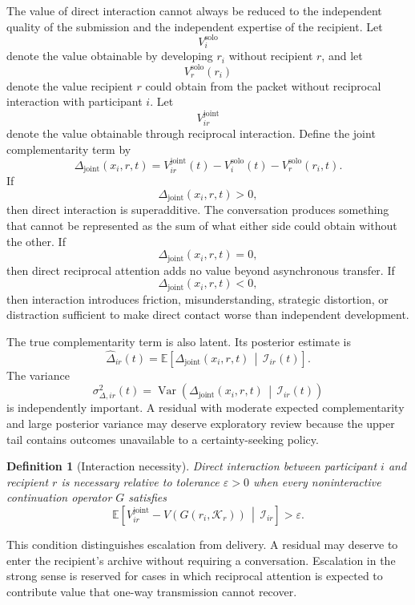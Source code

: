 \documentclass[11pt]{article}
\newtheorem{definition}{Definition}[section]
\theoremstyle{definition}
\DeclareMathOperator{\Var}{Var}
\newcommand{\E}{\mathbb{E}}
\newcommand{\K}{\mathcal{K}}
\newcommand{\given}{\,\middle|\,}
\newcommand{\eps}{\varepsilon}
\begin{document}
The value of direct interaction cannot always be reduced to the independent quality of the submission and the independent expertise of the recipient. Let
\[
V_i^{\mathrm{solo}}
\]
denote the value obtainable by developing \(r_i\) without recipient \(r\), and let
\[
V_r^{\mathrm{solo}}(r_i)
\]
denote the value recipient \(r\) could obtain from the packet without reciprocal interaction with participant \(i\). Let
\[
V_{ir}^{\mathrm{joint}}
\]
denote the value obtainable through reciprocal interaction. Define the joint complementarity term by
\[
\Delta_{\mathrm{joint}}(x_i,r,t)
=
V_{ir}^{\mathrm{joint}}(t)
-
V_i^{\mathrm{solo}}(t)
-
V_r^{\mathrm{solo}}(r_i,t).
\]
If
\[
\Delta_{\mathrm{joint}}(x_i,r,t)>0,
\]
then direct interaction is superadditive. The conversation produces something that cannot be represented as the sum of what either side could obtain without the other. If
\[
\Delta_{\mathrm{joint}}(x_i,r,t)=0,
\]
then direct reciprocal attention adds no value beyond asynchronous transfer. If
\[
\Delta_{\mathrm{joint}}(x_i,r,t)<0,
\]
then interaction introduces friction, misunderstanding, strategic distortion, or distraction sufficient to make direct contact worse than independent development.

The true complementarity term is also latent. Its posterior estimate is
\[
\widehat{\Delta}_{ir}(t)
=
\E\!\left[
\Delta_{\mathrm{joint}}(x_i,r,t)
\given
\mathscr{I}_{ir}(t)
\right].
\]
The variance
\[
\sigma_{\Delta,ir}^{2}(t)
=
\Var\!\left(
\Delta_{\mathrm{joint}}(x_i,r,t)
\given
\mathscr{I}_{ir}(t)
\right)
\]
is independently important. A residual with moderate expected complementarity and large posterior variance may deserve exploratory review because the upper tail contains outcomes unavailable to a certainty-seeking policy.

\begin{definition}[Interaction necessity]
Direct interaction between participant \(i\) and recipient \(r\) is necessary relative to tolerance \(\eps>0\) when every noninteractive continuation operator \(G\) satisfies
\[
\E\!\left[
V_{ir}^{\mathrm{joint}}
-
V\!\left(G(r_i,\K_r)\right)
\given
\mathscr{I}_{ir}
\right]
>
\eps.
\]
\end{definition}

This condition distinguishes escalation from delivery. A residual may deserve to enter the recipient's archive without requiring a conversation. Escalation in the strong sense is reserved for cases in which reciprocal attention is expected to contribute value that one-way transmission cannot recover.
\end{document}
